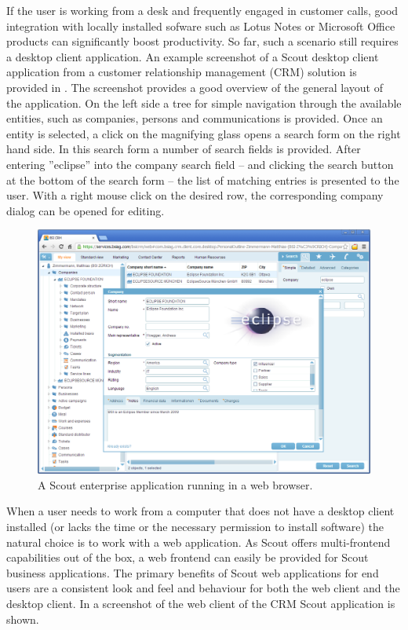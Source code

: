 \documentclass[a4paper,10pt,twoside]{book}
\begin{document}
If the user is working from a desk and frequently engaged in customer calls, good integration with locally installed sofware such as Lotus Notes or Microsoft Office products can significantly boost productivity.
So far, such a scenario still requires a desktop client application.
An example screenshot of a Scout desktop client application from a customer relationship management (CRM) solution is provided in .
The screenshot provides a good overview of the general layout of the application.
On the left side a tree for simple navigation through the available entities, such as companies, persons and communications is provided.
Once an entity is selected, a click on the magnifying glass opens a search form on the right hand side.
In this search form a number of search fields is provided.
After entering ''eclipse'' into the company search field -- and clicking the search button at the bottom of the search form -- the list of matching entries is presented to the user.
With a right mouse click on the desired row, the corresponding company dialog can be opened for editing.

\begin{figure}
\includegraphics[width=14cm]{bsi_crm_web.png}
\caption{A Scout enterprise application running in a web browser.}
\end{figure}

When a user needs to work from a computer that does not have a desktop client installed (or lacks the time or the necessary permission to install software) the natural choice is to work with a web application.
As Scout offers multi-frontend capabilities out of the box, a web frontend can easily be provided for Scout business applications.
The primary benefits of Scout web applications for end users are a consistent look and feel and behaviour for both the web client and the desktop client.
In  a screenshot of the web client of the CRM Scout application is shown.
\end{document}
